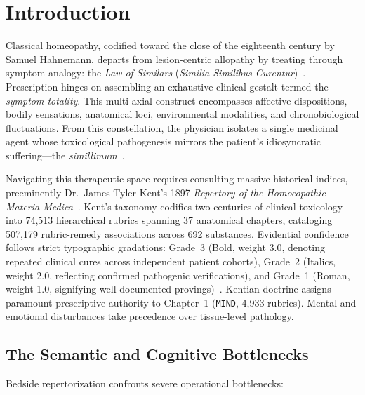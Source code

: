 \section{Introduction}
\label{sec:introduction}

Classical homeopathy, codified toward the close of the eighteenth century by Samuel Hahnemann, departs from lesion-centric allopathy by treating through symptom analogy: the \textit{Law of Similars} (\textit{Similia Similibus Curentur})~\cite{hahnemann1842,hahnemann1810}. Prescription hinges on assembling an exhaustive clinical gestalt termed the \textit{symptom totality}. This multi-axial construct encompasses affective dispositions, bodily sensations, anatomical loci, environmental modalities, and chronobiological fluctuations. From this constellation, the physician isolates a single medicinal agent whose toxicological pathogenesis mirrors the patient's idiosyncratic suffering---the \textit{simillimum}~\cite{sherr2002}.

Navigating this therapeutic space requires consulting massive historical indices, preeminently Dr.~James Tyler Kent's 1897 \textit{Repertory of the Homoeopathic Materia Medica}~\cite{kent1897}. Kent's taxonomy codifies two centuries of clinical toxicology into 74,513 hierarchical rubrics spanning 37 anatomical chapters, cataloging 507,179 rubric-remedy associations across 692 substances. Evidential confidence follows strict typographic gradations: Grade~3 (Bold, weight 3.0, denoting repeated clinical cures across independent patient cohorts), Grade~2 (Italics, weight 2.0, reflecting confirmed pathogenic verifications), and Grade~1 (Roman, weight 1.0, signifying well-documented provings)~\cite{kent1897,sherr2002}. Kentian doctrine assigns paramount prescriptive authority to Chapter~1 (\texttt{MIND}, 4,933 rubrics). Mental and emotional disturbances take precedence over tissue-level pathology.

\subsection{The Semantic and Cognitive Bottlenecks}

Bedside repertorization confronts severe operational bottlenecks:


